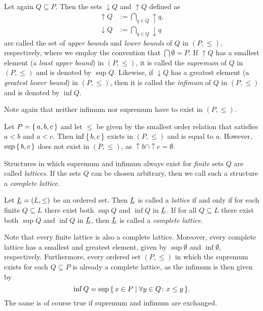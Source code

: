 Let again $Q \subseteq P$.  Then the sets ${\downarrow} Q$ and ${\uparrow} Q$ defined as
\begin{align*}
  {\uparrow} Q &:= \bigcap_{q \in Q} {\uparrow} q,\\
  {\downarrow} Q &:= \bigcap_{q \in Q} {\downarrow} q
\end{align*}
are called the set of \emph{upper bounds} and \emph{lower bounds} of $Q$ in $(P, \le)$,
respectively, where we employ the convention that $\bigcap \emptyset = P$.  If ${\uparrow}
Q$ has a smallest element (a \emph{least upper bound}) in $(P, \le)$, it is called the
\emph{supremum} of $Q$ in $(P, \le)$ and is denoted by $\sup Q$.  Likewise, if
${\downarrow} Q$ has a greatest element (a \emph{greatest lower bound}) in $(P, \le)$,
then it is called the \emph{infimum} of $Q$ in $(P, \le)$ and is denoted by $\inf Q$.

Note again that neither infimum nor supremum have to exist in $(P, \le)$.

\begin{Example}
  \label{expl:3}
  Let $P = {\{\, a, b, c \,\}}$ and let $\le$ be given by the smallest order relation that
  satisfies $a < b$ and $a < c$.  Then $\inf{\ensuremath{\{\,b,c\,\}}}$ exists in $(P, \le)$ and is equal
  to $a$.  However, $\sup{\ensuremath{\{\,b, c\,\}}}$ does not exist in $(P, \le)$, as ${\uparrow} b \cap
  {\uparrow} c = \emptyset$.
\end{Example}

\noindent%
Structures in which supremum and infimum always exist for \emph{finite} sets $Q$ are
called \emph{lattices}.  If the sets $Q$ can be chosen arbitrary, then we call such a
structure a \emph{complete lattice}.

\begin{Definition}[Lattice]
  \label{def:lattice}
  Let ${\underline{L}} = (L, \le)$ be an ordered set.  Then ${\underline{L}}$ is called a \emph{lattice} if
  and only if for each finite $Q \subseteq L$ there exist both $\sup Q$ and $\inf Q$ in
  ${\underline{L}}$.  If for all $Q \subseteq L$ there exist both $\sup Q$ and $\inf Q$ in ${\underline{L}}$, then ${\underline{L}}$ is called a \emph{complete lattice}.
\end{Definition}

\noindent%
Note that every finite lattice is also a complete lattice.  Moreover, every complete
lattice has a smallest and greatest element, given by $\sup\emptyset$ and $\inf\emptyset$,
respectively.  Furthermore, every ordered set $(P, \le)$ in which the supremum exists for
each $Q \subseteq P$ is already a complete lattice, as the infimum is then given by
\begin{equation*}
  \inf Q = \sup{\ensuremath{\{\, x \in P \mid \forall y \in Q \colon x \le y \,\}}}.
\end{equation*}
The same is of course true if supremum and infimum are exchanged.

